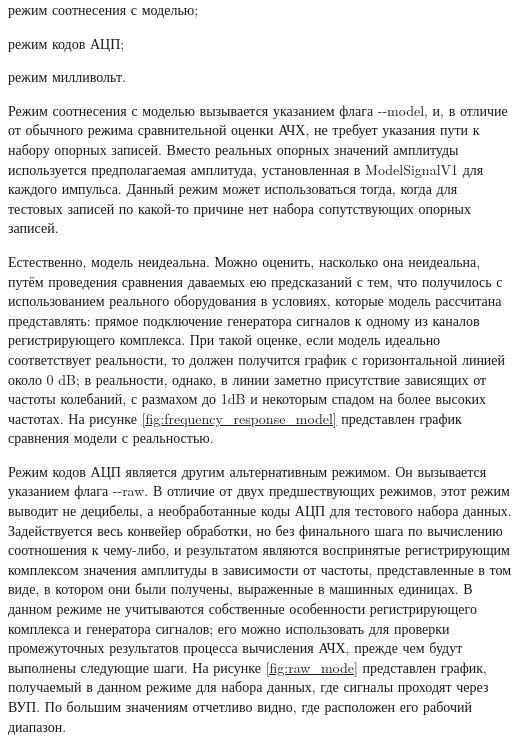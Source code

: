 \documentclass{report}
\begin{document}
\begin{enummarker}
    \item режим соотнесения с моделью;
    \item режим кодов АЦП;
    \item режим милливольт.
\end{enummarker}

Режим соотнесения с моделью вызывается указанием флага -{}-model, и, в отличие от обычного режима сравнительной оценки АЧХ, не требует указания пути к набору опорных записей. Вместо реальных опорных значений амплитуды используется предполагаемая амплитуда, установленная в ModelSignalV1 для каждого импульса. Данный режим может использоваться тогда, когда для тестовых записей по какой-то причине нет набора сопутствующих опорных записей.

Естественно, модель неидеальна. Можно оценить, насколько она неидеальна, путём проведения сравнения даваемых ею предсказаний с тем, что получилось с использованием реального оборудования в условиях, которые модель рассчитана представлять: прямое подключение генератора сигналов к одному из каналов регистрирующего комплекса. При такой оценке, если модель идеально соответствует реальности, то должен получится график с горизонтальной линией около 0 dB; в реальности, однако, в линии заметно присутствие зависящих от частоты колебаний, с размахом до 1dB и некоторым спадом на более высоких частотах. На рисунке \ref{fig:frequency_response_model} представлен график сравнения модели с реальностью.


Режим кодов АЦП является другим альтернативным режимом. Он вызывается указанием флага -{}-raw. В отличие от двух предшествующих режимов, этот режим выводит не децибелы, а необработанные коды АЦП для тестового набора данных. Задействуется весь конвейер обработки, но без финального шага по вычислению соотношения к чему-либо, и результатом являются воспринятые регистрирующим комплексом значения амплитуды в зависимости от частоты, представленные в том виде, в котором они были получены, выраженные в машинных единицах. В данном режиме не учитываются собственные особенности регистрирующего комплекса и генератора сигналов; его можно использовать для проверки промежуточных результатов процесса вычисления АЧХ, прежде чем будут выполнены следующие шаги. На рисунке \ref{fig:raw_mode} представлен график, получаемый в данном режиме для набора данных, где сигналы проходят через ВУП. По большим значениям отчетливо видно, где расположен его рабочий диапазон.
\end{document}
